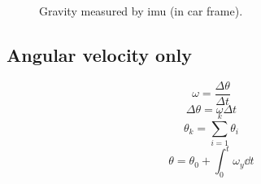 \begin{figure}[htpb]
    \centering
    
    \caption{Gravity measured by \acrshort{imu} (in car frame).}
    \label{fig:tikz_car_gravity}
\end{figure}

\subsection{Angular velocity only}
\begin{equation}
    \omega = \frac{\Delta\theta}{\Delta t}
\end{equation}
\begin{equation}
    \Delta\theta = \omega\Delta t
\end{equation}
\begin{equation}
    \theta_k = \sum_{i = 1}^k \theta_i
\end{equation}
\begin{equation}
    \theta = \theta_0 + \int_0^t \omega_y \dd{t}
\end{equation}

